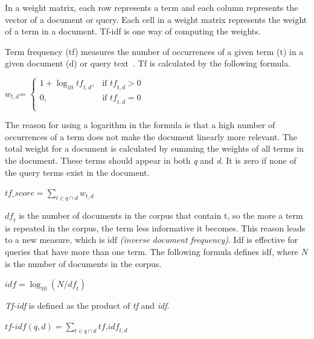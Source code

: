 \documentclass{IOS-Book-Article}
\begin{document}
In a weight matrix, each row represents a term and each column represents the vector of a document or query. Each cell in a weight matrix represents the weight of a term in a document. Tf-idf is one way of computing the weights.

Term frequency (tf) measures the number of occurrences of a given term (t) in a given document (d) or query text~\citep{SALTON1988}. 
Tf is calculated by the following formula. 
\begin{center} 
	$w_{t,d}$=
	$\begin{cases}
	1+\log_{10} \mathit{tf}_{t,d}, & \text{if $\mathit{tf}_{t,d}>0$} \\
	0, & \text{if $\mathit{tf}_{t,d}=0$}\\
	\end{cases}$
\end{center}

The reason for using a logarithm in the formula is that a high number of occurrences of a term does not make the document linearly more relevant.
The total weight for a document is calculated by summing the weights of all terms in the document.
These terms should appear in both \textit{q} and \textit{d}.
It is zero if none of the query terms exist in the document.

\begin{center}
	$\mathit{tf\_score}=\sum_{t\in q\cap d} w_{t,d}$
\end{center}

$\mathit{df}_t$ is the number of documents in the corpus that contain t, so the more a term is repeated in the corpus, the term less informative it becomes.
This reason leads to a new measure, which is idf \emph{(inverse document frequency)}.
Idf is effective for queries that have more than one term.
The following formula defines idf, where $N$ is the number of documents in the corpus.

\begin{center} 
	$\mathit{idf}=\log_{10} (N/\mathit{df}_t)$
\end{center}

\emph{Tf-idf} is defined as the product of \emph{tf} and \emph{idf}. 

\begin{center}
	$\textit{tf-idf}(q,d)=\sum_{t\in q\cap d} \mathit{tf}.\mathit{idf}_{t,d}$
\end{center}
\end{document}
